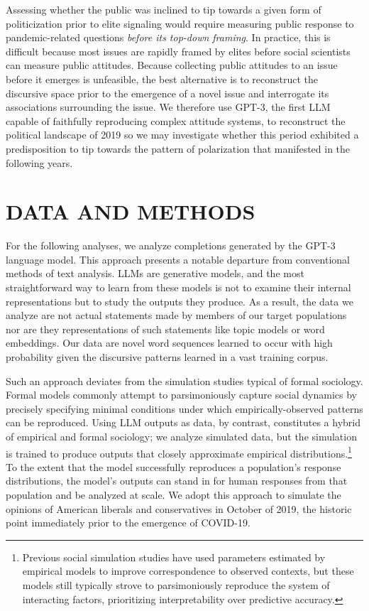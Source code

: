 \documentclass{article}
\begin{document}
Assessing whether the public was inclined to tip towards a given form of
politicization prior to elite signaling would require measuring public
response to pandemic-related questions \emph{before its top-down
framing}. In practice, this is difficult because most issues are rapidly
framed by elites before social scientists can measure public attitudes.
Because collecting public attitudes to an issue before it emerges is
unfeasible, the best alternative is to reconstruct the discursive space
prior to the emergence of a novel issue and interrogate its associations
surrounding the issue. We therefore use GPT-3, the first LLM capable of
faithfully reproducing complex attitude systems, to reconstruct the
political landscape of 2019 so we may investigate whether this period
exhibited a predisposition to tip towards the pattern of polarization
that manifested in the following years.

\section*{DATA AND METHODS}

For the following analyses, we analyze completions generated by the
GPT-3 language model. This approach presents a notable departure from
conventional methods of text analysis. LLMs are generative models, and
the most straightforward way to learn from these models is not to
examine their internal representations but to study the outputs they
produce. As a result, the data we analyze are not actual statements made
by members of our target populations nor are they representations of
such statements like topic models or word embeddings. Our data are novel
word sequences learned to occur with high probability given the
discursive patterns learned in a vast training corpus.

Such an approach deviates from the simulation studies typical of formal
sociology. Formal models commonly attempt to parsimoniously capture
social dynamics by precisely specifying minimal conditions under which
empirically-observed patterns can be reproduced. Using LLM outputs as
data, by contrast, constitutes a hybrid of empirical and formal
sociology; we analyze simulated data, but the simulation is trained to
produce outputs that closely approximate empirical
distributions.\footnote{Previous social simulation studies have used
  parameters estimated by empirical models to improve correspondence to
  observed contexts, but these models still typically strove to
  parsimoniously reproduce the system of interacting factors,
  prioritizing interpretability over predictive accuracy.} To the extent
that the model successfully reproduces a population's response
distributions, the model's outputs can stand in for human responses from
that population and be analyzed at scale. We adopt this approach to
simulate the opinions of American liberals and conservatives in October
of 2019, the historic point immediately prior to the emergence of
COVID-19.
\end{document}
